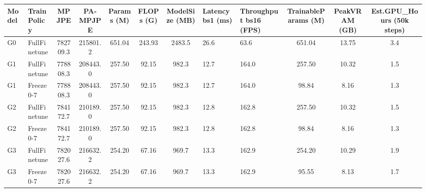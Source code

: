 \begin{tabular}{l|l|cc|cccp{1cm}p{1cm}|ccc}
\toprule
Model & TrainPolicy & MPJPE & PA-MPJPE & Params (M) & FLOPs (G) & ModelSize (MB) & Latency bs1 (ms) & Throughput bs16 (FPS) & TrainableParams (M) & PeakVRAM (GB) & Est.GPU_Hours (50k steps) \\
\midrule
G0 & FullFinetune & 782709.3 & 215801.2 & 651.04 & 243.93 & 2483.5 & 26.6 & 63.6 & 651.04 & 13.75 & 3.4 \\
G1 & FullFinetune & 778808.3 & 208443.0 & 257.50 & 92.15 & 982.3 & 12.7 & 164.0 & 257.50 & 10.32 & 1.5 \\
G1 & Freeze0-7 & 778808.3 & 208443.0 & 257.50 & 92.15 & 982.3 & 12.7 & 164.0 & 98.84 & 8.16 & 1.3 \\
G2 & FullFinetune & 784172.7 & 210189.0 & 257.50 & 92.15 & 982.3 & 12.8 & 162.8 & 257.50 & 10.32 & 1.5 \\
G2 & Freeze0-7 & 784172.7 & 210189.0 & 257.50 & 92.15 & 982.3 & 12.8 & 162.8 & 98.84 & 8.16 & 1.3 \\
G3 & FullFinetune & 782027.6 & 216632.2 & 254.20 & 67.16 & 969.7 & 13.3 & 162.9 & 254.20 & 10.29 & 1.9 \\
G3 & Freeze0-7 & 782027.6 & 216632.2 & 254.20 & 67.16 & 969.7 & 13.3 & 162.9 & 95.55 & 8.13 & 1.7 \\
\bottomrule
\end{tabular}
